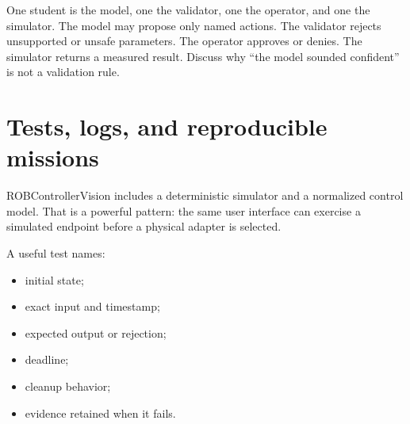 \documentclass[11pt,openany]{book}
\begin{document}
\begin{buildbox}[title={HUMAN-IN-CHARGE ROLE PLAY}]
One student is the model, one the validator, one the operator, and one the simulator. The model may propose only named actions. The validator rejects unsupported or unsafe parameters. The operator approves or denies. The simulator returns a measured result. Discuss why ``the model sounded confident'' is not a validation rule.
\end{buildbox}



\chapter{Tests, logs, and reproducible missions}

ROBControllerVision includes a deterministic simulator and a normalized control model. That is a powerful pattern: the same user interface can exercise a simulated endpoint before a physical adapter is selected.

A useful test names:

\begin{itemize}
  \item initial state;
  \item exact input and timestamp;
  \item expected output or rejection;
  \item deadline;
  \item cleanup behavior;
  \item evidence retained when it fails.
\end{itemize}
\end{document}
